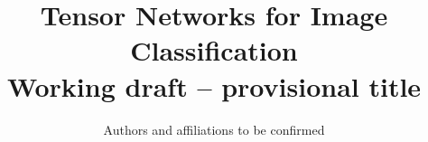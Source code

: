 \documentclass[11pt,a4paper]{article}
\title{Tensor Networks for Image Classification\\
\large Working draft -- provisional title}
\author{Authors and affiliations to be confirmed}
\date{}
\begin{document}
\maketitle

\begin{abstract}

\end{abstract}








% 
% 
\end{document}
